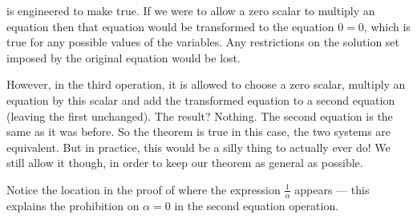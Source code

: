  is engineered to make  true.  If we were to allow a zero scalar to multiply an equation then that equation would be transformed to the equation $0=0$, which is true for any possible values of the variables.  Any restrictions on the solution set imposed by the original equation would be lost.\par
%
However, in the third operation, it is allowed to choose a zero scalar, multiply an equation by this scalar and add the transformed equation to a second equation (leaving the first unchanged).  The result?  Nothing.  The second equation is the same as it was before.  So the theorem is true in this case, the two systems are equivalent.  But in practice, this would be a silly thing to actually ever do!  We still allow it though, in order to keep our theorem as general as possible.\par
%
Notice the location in the proof of  where the expression $\frac{1}{\alpha}$ appears --- this explains the prohibition on $\alpha=0$ in the second equation operation.